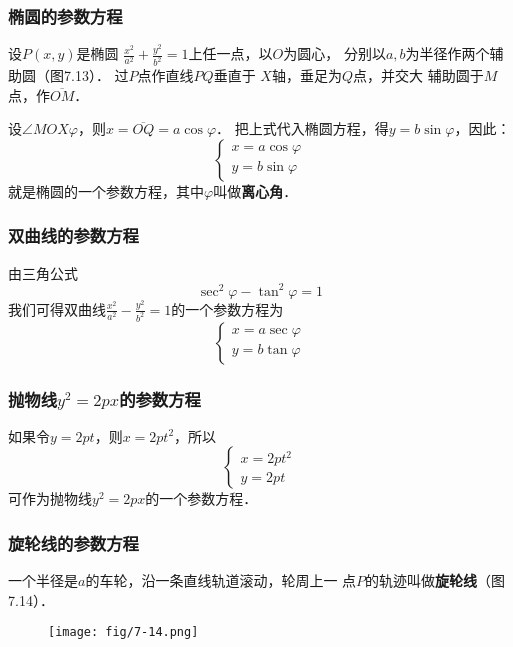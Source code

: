 \subsubsection{椭圆的参数方程}
    设$P(x,y)$是椭圆
$\frac{x^2}{a^2}+\frac{y^2}{b^2}=1$上任一点，以$O$为圆心，
分别以$a,b$为半径作两个辅助圆（图7.13）．
过$P$点作直线$PQ$垂直于
$X$轴，垂足为$Q$点，并交大
辅助圆于$M$点，作$\overline{OM}$．

设$\angle MOX\varphi$，则$x=\overline{OQ}=a\cos\varphi$．
把上式代入椭圆方程，得$y=b\sin\varphi$，因此：
\begin{equation}
    \begin{cases}
        x=a\cos\varphi\\
        y=b\sin\varphi     
    \end{cases}
\end{equation}
就是椭圆的一个参数方程，其中$\varphi$叫做\textbf{离心角}．

\subsubsection{双曲线的参数方程}

由三角公式
\[\sec^2\varphi-\tan^2\varphi=1\]
我们可得双曲线$\frac{x^2}{a^2}-\frac{y^2}{b^2}=1$的一个参数方程为
\begin{equation}
    \begin{cases}
        x=a\sec\varphi\\
       y=b\tan\varphi
    \end{cases}
\end{equation}

\subsubsection{抛物线$y^2=2px$的参数方程}

如果令$y=2pt$，则$x=2pt^2$，所以
\begin{equation}
    \begin{cases}
        x=2pt^2\\ y=2pt
    \end{cases}
\end{equation}
可作为抛物线$y^2=2px$的一个参数方程．

\subsubsection{旋轮线的参数方程}
一个半径是$a$的车轮，沿一条直线轨道滚动，轮周上一
点$P$的轨迹叫做\textbf{旋轮线}（图7.14）．
\begin{figure}[htp]
    \centering
\texttt{[image: fig/7-14.png]}
    \caption{}
\end{figure}

